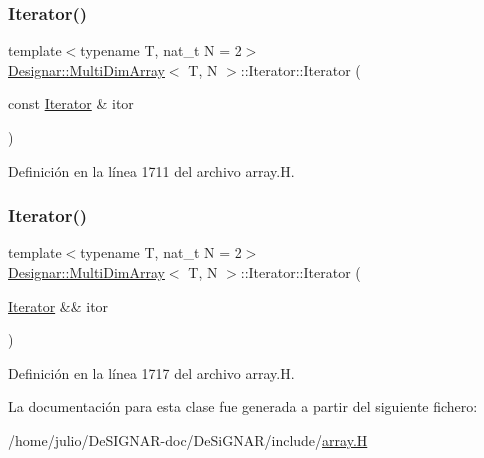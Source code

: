 \mbox{\label{class_designar_1_1_multi_dim_array_1_1_iterator_a2d0c217ae08b2203c50e1d1a01c3af40}} 
\subsubsection{\texorpdfstring{Iterator()}{Iterator()}\hspace{0.1cm}{\footnotesize\ttfamily [4/5]}}
{\footnotesize\ttfamily template$<$typename T, nat\+\_\+t N = 2$>$ \\
\hyperlink{class_designar_1_1_multi_dim_array}{Designar\+::\+Multi\+Dim\+Array}$<$ T, N $>$\+::Iterator\+::\+Iterator (\begin{DoxyParamCaption}\item[{const \hyperlink{class_designar_1_1_multi_dim_array_1_1_iterator}{Iterator} \&}]{itor }\end{DoxyParamCaption})\hspace{0.3cm}{\ttfamily [inline]}}



Definición en la línea 1711 del archivo array.\+H.

\mbox{\label{class_designar_1_1_multi_dim_array_1_1_iterator_af6ebf97caae786b50dcb6062b3ab7b0b}} 
\subsubsection{\texorpdfstring{Iterator()}{Iterator()}\hspace{0.1cm}{\footnotesize\ttfamily [5/5]}}
{\footnotesize\ttfamily template$<$typename T, nat\+\_\+t N = 2$>$ \\
\hyperlink{class_designar_1_1_multi_dim_array}{Designar\+::\+Multi\+Dim\+Array}$<$ T, N $>$\+::Iterator\+::\+Iterator (\begin{DoxyParamCaption}\item[{\hyperlink{class_designar_1_1_multi_dim_array_1_1_iterator}{Iterator} \&\&}]{itor }\end{DoxyParamCaption})\hspace{0.3cm}{\ttfamily [inline]}}



Definición en la línea 1717 del archivo array.\+H.



La documentación para esta clase fue generada a partir del siguiente fichero\+:\begin{DoxyCompactItemize}
\item 
/home/julio/\+De\+S\+I\+G\+N\+A\+R-\/doc/\+De\+Si\+G\+N\+A\+R/include/\hyperlink{array_8_h}{array.\+H}\end{DoxyCompactItemize}
